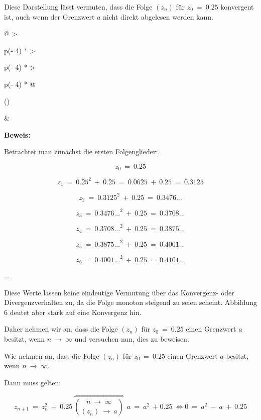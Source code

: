 \documentclass{book}
\begin{document}
Diese Darstellung lässt vermuten, dass die Folge
\(\left( z_{n} \right)\) für \(z_{0}\  = \ 0.25\) konvergent ist, auch
wenn der Grenzwert \(a\) nicht direkt abgelesen werden kann.

\begin{longtable}[]{@{}
  >{\raggedright\arraybackslash}p{(\columnwidth - 4\tabcolsep) * }
  >{\raggedright\arraybackslash}p{(\columnwidth - 4\tabcolsep) * }
  >{\raggedright\arraybackslash}p{(\columnwidth - 4\tabcolsep) * }@{}}
\toprule()
\begin{minipage}[b]{\linewidth}\raggedright
\end{minipage} & \begin{minipage}[b]{\linewidth}\raggedright
\textbf{Beweis:}

Betrachtet man zunächst die ersten Folgenglieder:

\[z_{0}\  = \ 0.25\]

\[z_{1}\  = \ {0.25}^{2}\  + \ 0.25\  = \ 0.0625\  + \ 0.25\  = \ 0.3125\]

\[z_{2}\  = \ {0.3125}^{2}\  + \ 0.25\  = \ 0.3476...\]

\[z_{3}\  = \ {0.3476...}^{2}\  + \ 0.25\  = \ 0.3708...\]

\[z_{4}\  = \ {0.3708...}^{2}\  + \ 0.25\  = \ 0.3875...\]

\[z_{5}\  = \ {0.3875...}^{2}\  + \ 0.25\  = \ 0.4001...\]

\[z_{6}\  = \ {0.4001...}^{2}\  + \ 0.25\  = \ 0.4101...\]

...

Diese Werte lassen keine eindeutige Vermutung über das Konvergenz- oder
Divergenzverhalten zu, da die Folge monoton steigend zu seien scheint.
Abbildung 6 deutet aber stark auf eine Konvergenz hin.

Daher nehmen wir an, dass die Folge \(\left( z_{n} \right)\) für
\(z_{0}\  = \ 0.25\) einen Grenzwert \(a\) besitzt, wenn
\(n\  \rightarrow \ \infty\) und versuchen nun, dies zu beweisen.

Wie nehmen an, dass die Folge \(\left( z_{n} \right)\) für
\(z_{0}\  = \ 0.25\) einen Grenzwert \(a\) besitzt, wenn
\(n\  \rightarrow \ \infty\).

Dann muss gelten:

\[z_{n + 1}\  = \ z_{n}^{2}\  + \ 0.25\ \overset{\Leftrightarrow}{\binom{n\  \rightarrow \ \infty}{\left( z_{n} \right)\  \rightarrow \ a}}\ \ a\  = \ a^{2}\  + 0.25\  \Longleftrightarrow 0\  = \ a^{2}\  - \ a\  + \ 0.25\]


\end{minipage}
\end{longtable}
\end{document}
